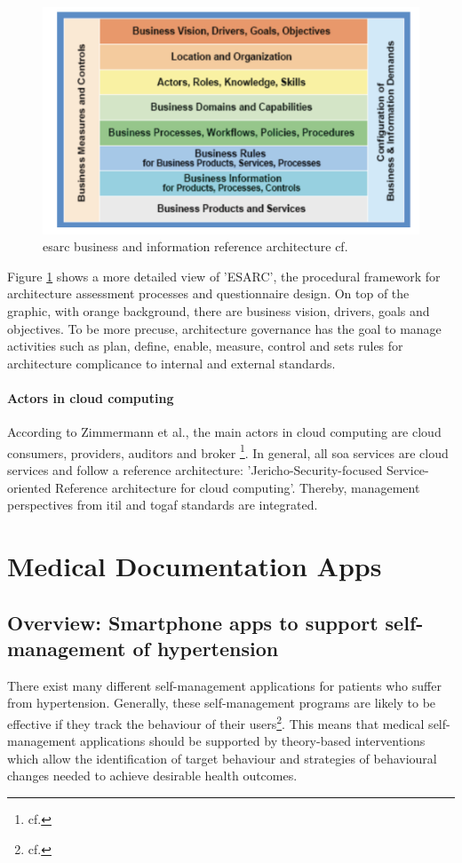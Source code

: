 \begin{figure}[htbp]
	\centering
	\includegraphics[width=1\textwidth]{images/esarc_business.png}
	\caption{\ac{esarc} business and information reference architecture cf.\autocite{zimmermann}}
	\label{vp_architecture}
\end{figure}

Figure \ref{vp_architecture} shows a more detailed view of 'ESARC', the procedural framework for architecture assessment processes and questionnaire design. On top of the graphic, with orange background, there are business vision, drivers, goals and objectives. To be more precuse, architecture governance has the goal to manage activities such as plan, define, enable, measure, control and sets rules for architecture complicance to internal and external standards. 

\paragraph{Actors in cloud computing}
According to Zimmermann et al., the main actors in cloud computing are cloud consumers, providers, auditors and broker \footnote{cf.\autocite{zimmermann}}. In general, all \ac{soa} services are cloud services and follow a reference architecture: 'Jericho-Security-focused Service-oriented Reference architecture for cloud computing'. Thereby, management perspectives from \ac{itil} and \ac{togaf} standards are integrated.

\section{Medical Documentation Apps}

\subsection{Overview: Smartphone apps to support self-management of hypertension}
There exist many different self-management applications for patients who suffer from hypertension. Generally, these self-management programs are likely to be effective if they track the behaviour of their users\footnote{cf.\autocite{alessa}}. This means that medical self-management applications should be supported by theory-based interventions which allow the identification of target behaviour and strategies of behavioural changes needed to achieve desirable health outcomes.
